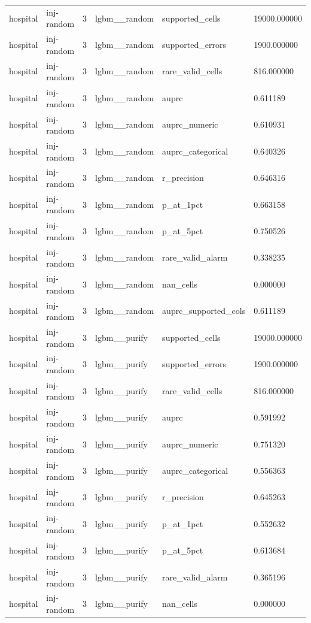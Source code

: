 \begin{tabular}{llllll}
hospital & inj-random & 3 & lgbm\_\_random & supported\_cells & 19000.000000 \\
hospital & inj-random & 3 & lgbm\_\_random & supported\_errors & 1900.000000 \\
hospital & inj-random & 3 & lgbm\_\_random & rare\_valid\_cells & 816.000000 \\
hospital & inj-random & 3 & lgbm\_\_random & auprc & 0.611189 \\
hospital & inj-random & 3 & lgbm\_\_random & auprc\_numeric & 0.610931 \\
hospital & inj-random & 3 & lgbm\_\_random & auprc\_categorical & 0.640326 \\
hospital & inj-random & 3 & lgbm\_\_random & r\_precision & 0.646316 \\
hospital & inj-random & 3 & lgbm\_\_random & p\_at\_1pct & 0.663158 \\
hospital & inj-random & 3 & lgbm\_\_random & p\_at\_5pct & 0.750526 \\
hospital & inj-random & 3 & lgbm\_\_random & rare\_valid\_alarm & 0.338235 \\
hospital & inj-random & 3 & lgbm\_\_random & nan\_cells & 0.000000 \\
hospital & inj-random & 3 & lgbm\_\_random & auprc\_supported\_cols & 0.611189 \\
hospital & inj-random & 3 & lgbm\_\_purify & supported\_cells & 19000.000000 \\
hospital & inj-random & 3 & lgbm\_\_purify & supported\_errors & 1900.000000 \\
hospital & inj-random & 3 & lgbm\_\_purify & rare\_valid\_cells & 816.000000 \\
hospital & inj-random & 3 & lgbm\_\_purify & auprc & 0.591992 \\
hospital & inj-random & 3 & lgbm\_\_purify & auprc\_numeric & 0.751320 \\
hospital & inj-random & 3 & lgbm\_\_purify & auprc\_categorical & 0.556363 \\
hospital & inj-random & 3 & lgbm\_\_purify & r\_precision & 0.645263 \\
hospital & inj-random & 3 & lgbm\_\_purify & p\_at\_1pct & 0.552632 \\
hospital & inj-random & 3 & lgbm\_\_purify & p\_at\_5pct & 0.613684 \\
hospital & inj-random & 3 & lgbm\_\_purify & rare\_valid\_alarm & 0.365196 \\
hospital & inj-random & 3 & lgbm\_\_purify & nan\_cells & 0.000000 \\

\end{tabular}
